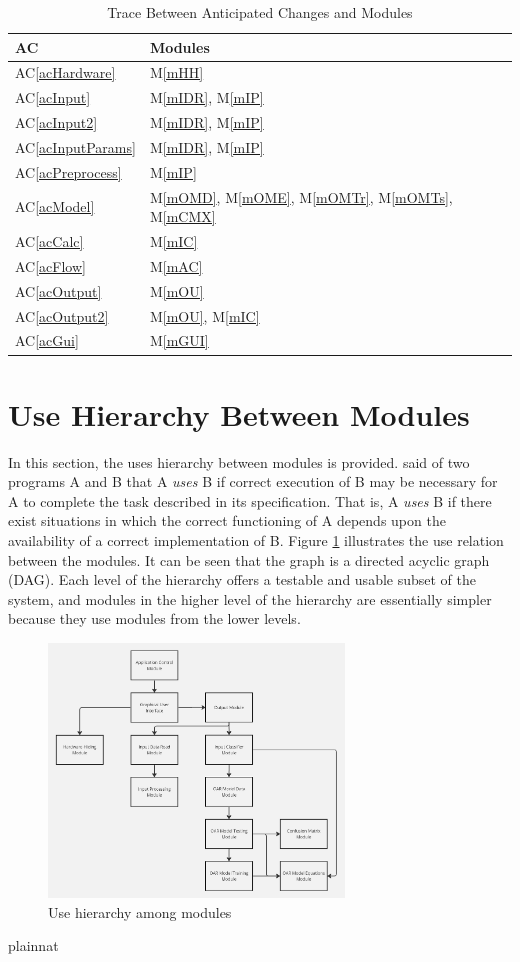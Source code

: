 \documentclass[12pt, titlepage]{article}
\newcommand{\acref}[1]{AC\ref{#1}}
\newcommand{\mref}[1]{M\ref{#1}}
\begin{document}
\begin{table}[H]
\centering
\begin{tabular}{p{} p{}}
\toprule
\textbf{AC} & \textbf{Modules}\\
\midrule
\acref{acHardware} & \mref{mHH}\\
\acref{acInput} & \mref{mIDR}, \mref{mIP}\\
\acref{acInput2} & \mref{mIDR}, \mref{mIP}\\
\acref{acInputParams} & \mref{mIDR}, \mref{mIP}\\
\acref{acPreprocess} & \mref{mIP}\\
\acref{acModel} & \mref{mOMD}, \mref{mOME}, \mref{mOMTr}, \mref{mOMTs}, \mref{mCMX}\\
\acref{acCalc} & \mref{mIC}\\
\acref{acFlow} & \mref{mAC}\\
\acref{acOutput} & \mref{mOU}\\
\acref{acOutput2} & \mref{mOU}, \mref{mIC}\\
\acref{acGui} & \mref{mGUI}\\
\bottomrule
\end{tabular}
\caption{Trace Between Anticipated Changes and Modules}
\label{TblACT}
\end{table}

\section{Use Hierarchy Between Modules} \label{SecUse}

In this section, the uses hierarchy between modules is
provided. \citet{Parnas1978} said of two programs A and B that A {\em uses} B if
correct execution of B may be necessary for A to complete the task described in
its specification. That is, A {\em uses} B if there exist situations in which
the correct functioning of A depends upon the availability of a correct
implementation of B.  Figure \ref{FigUH} illustrates the use relation between
the modules. It can be seen that the graph is a directed acyclic graph
(DAG). Each level of the hierarchy offers a testable and usable subset of the
system, and modules in the higher level of the hierarchy are essentially simpler
because they use modules from the lower levels.

\begin{figure}[H]
\centering
\includegraphics[width=0.7\textwidth]{OAR_UH}
\caption{Use hierarchy among modules}
\label{FigUH}
\end{figure}

 {plainnat}


\newpage{}
\end{document}
